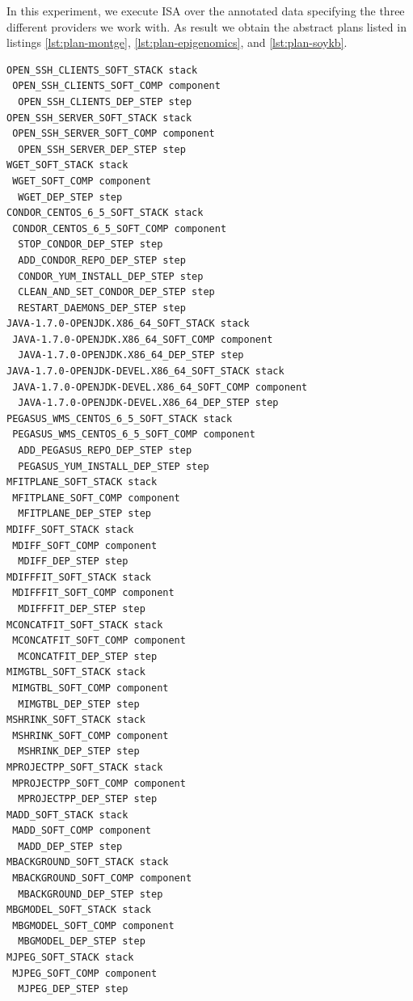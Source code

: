 In this experiment, we execute ISA over the annotated data specifying the three different providers we work with. As result we obtain the abstract plans listed in listings \ref{lst:plan-montge}, \ref{lst:plan-epigenomics}, and \ref{lst:plan-soykb}. 



\begin{lstlisting}[caption={Abstract deployment plan of the Montage WF},label={lst:plan-montge}]
OPEN_SSH_CLIENTS_SOFT_STACK stack
 OPEN_SSH_CLIENTS_SOFT_COMP component
  OPEN_SSH_CLIENTS_DEP_STEP step
OPEN_SSH_SERVER_SOFT_STACK stack
 OPEN_SSH_SERVER_SOFT_COMP component
  OPEN_SSH_SERVER_DEP_STEP step
WGET_SOFT_STACK stack
 WGET_SOFT_COMP component
  WGET_DEP_STEP step
CONDOR_CENTOS_6_5_SOFT_STACK stack
 CONDOR_CENTOS_6_5_SOFT_COMP component
  STOP_CONDOR_DEP_STEP step
  ADD_CONDOR_REPO_DEP_STEP step
  CONDOR_YUM_INSTALL_DEP_STEP step
  CLEAN_AND_SET_CONDOR_DEP_STEP step
  RESTART_DAEMONS_DEP_STEP step
JAVA-1.7.0-OPENJDK.X86_64_SOFT_STACK stack
 JAVA-1.7.0-OPENJDK.X86_64_SOFT_COMP component
  JAVA-1.7.0-OPENJDK.X86_64_DEP_STEP step
JAVA-1.7.0-OPENJDK-DEVEL.X86_64_SOFT_STACK stack
 JAVA-1.7.0-OPENJDK-DEVEL.X86_64_SOFT_COMP component
  JAVA-1.7.0-OPENJDK-DEVEL.X86_64_DEP_STEP step
PEGASUS_WMS_CENTOS_6_5_SOFT_STACK stack
 PEGASUS_WMS_CENTOS_6_5_SOFT_COMP component
  ADD_PEGASUS_REPO_DEP_STEP step
  PEGASUS_YUM_INSTALL_DEP_STEP step
MFITPLANE_SOFT_STACK stack
 MFITPLANE_SOFT_COMP component
  MFITPLANE_DEP_STEP step
MDIFF_SOFT_STACK stack
 MDIFF_SOFT_COMP component
  MDIFF_DEP_STEP step
MDIFFFIT_SOFT_STACK stack
 MDIFFFIT_SOFT_COMP component
  MDIFFFIT_DEP_STEP step
MCONCATFIT_SOFT_STACK stack
 MCONCATFIT_SOFT_COMP component
  MCONCATFIT_DEP_STEP step
MIMGTBL_SOFT_STACK stack
 MIMGTBL_SOFT_COMP component
  MIMGTBL_DEP_STEP step
MSHRINK_SOFT_STACK stack
 MSHRINK_SOFT_COMP component
  MSHRINK_DEP_STEP step
MPROJECTPP_SOFT_STACK stack
 MPROJECTPP_SOFT_COMP component
  MPROJECTPP_DEP_STEP step
MADD_SOFT_STACK stack
 MADD_SOFT_COMP component
  MADD_DEP_STEP step
MBACKGROUND_SOFT_STACK stack
 MBACKGROUND_SOFT_COMP component
  MBACKGROUND_DEP_STEP step
MBGMODEL_SOFT_STACK stack
 MBGMODEL_SOFT_COMP component
  MBGMODEL_DEP_STEP step
MJPEG_SOFT_STACK stack
 MJPEG_SOFT_COMP component
  MJPEG_DEP_STEP step
\end{lstlisting}


